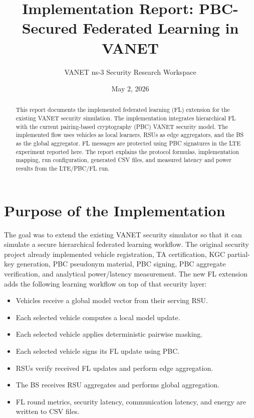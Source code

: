\documentclass[11pt,a4paper]{article}
\title{Implementation Report: PBC-Secured Federated Learning in VANET}
\author{VANET ns-3 Security Research Workspace}
\date{May 2, 2026}
\begin{document}
\maketitle

\begin{abstract}
This report documents the implemented federated learning (FL) extension for the
existing VANET security simulation. The implementation integrates hierarchical
FL with the current pairing-based cryptography (PBC) VANET security model. The
implemented flow uses vehicles as local learners, RSUs as edge aggregators, and
the BS as the global aggregator. FL messages are protected using PBC signatures
in the LTE experiment reported here. The report explains the protocol formulas,
implementation mapping, run configuration, generated CSV files, and measured
latency and power results from the LTE/PBC/FL run.
\end{abstract}

\tableofcontents
\newpage

\section{Purpose of the Implementation}

The goal was to extend the existing VANET security simulator so that it can
simulate a secure hierarchical federated learning workflow. The original
security project already implemented vehicle registration, TA certification,
KGC partial-key generation, PBC pseudonym material, PBC signing, PBC aggregate
verification, and analytical power/latency measurement. The new FL extension
adds the following learning workflow on top of that security layer:

\begin{itemize}[leftmargin=*]
  \item Vehicles receive a global model vector from their serving RSU.
  \item Each selected vehicle computes a local model update.
  \item Each selected vehicle applies deterministic pairwise masking.
  \item Each selected vehicle signs its FL update using PBC.
  \item RSUs verify received FL updates and perform edge aggregation.
  \item The BS receives RSU aggregates and performs global aggregation.
  \item FL round metrics, security latency, communication latency, and energy are written to CSV files.
\end{itemize}
\end{document}
